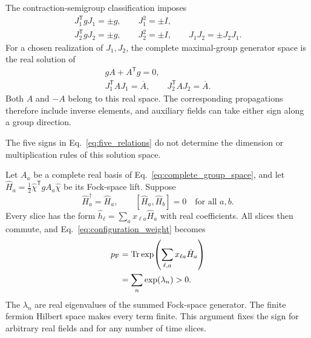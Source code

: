 \documentclass[onecolumn,aps,prb,amsmath,amssymb,superscriptaddress,longbibliography]{revtex4-2}
\newcommand{\Tr}{\operatorname{Tr}}
\newcommand{\trans}{\mathsf{T}}
\begin{document}
The contraction-semigroup classification imposes
\begin{equation}
\begin{gathered}
    J_1^\trans gJ_1=\pm g,\qquad J_1^2=\pm I,\\
    J_2^\trans gJ_2=\pm g,\qquad J_2^2=\pm I,\qquad
    J_1J_2=\pm J_2J_1 .
\end{gathered}
    \label{eq:five_relations}
\end{equation}
For a chosen realization of \(J_1,J_2\), the complete maximal-group generator
space is the real solution of
\begin{equation}
\begin{gathered}
    gA+A^\trans g=0,\\
    J_1^\trans AJ_1=\overline A,\qquad
    J_2^\trans AJ_2=\overline A .
\end{gathered}
    \label{eq:complete_group_space}
\end{equation}
Both \(A\) and \(-A\) belong to this real space.  The corresponding
propagations therefore include inverse elements, and auxiliary fields can take
either sign along a group direction.

The five signs in Eq.~\eqref{eq:five_relations} do not determine the dimension
or multiplication rules of this solution space.

Let \(A_a\) be a complete real basis of
Eq.~\eqref{eq:complete_group_space}, and let
\(\hat H_a=\frac12\hat\chi^\trans gA_a\hat\chi\) be its Fock-space lift.
Suppose
\begin{equation}
    \hat H_a^\dagger=\hat H_a,
    \qquad
    [\hat H_a,\hat H_b]=0
    \quad\text{for all }a,b .
    \label{eq:commuting_hermitian_condition}
\end{equation}
Every slice has the form
\(\hat h_\ell=\sum_a x_{\ell a}\hat H_a\) with real coefficients.  All slices
then commute, and Eq.~\eqref{eq:configuration_weight} becomes
\begin{equation}
\begin{aligned}
    p_{\rm F}
    &=\Tr\exp\!\left(\sum_{\ell,a}x_{\ell a}\hat H_a\right)\\
    &=\sum_n \exp(\lambda_n)>0 .
\end{aligned}
    \label{eq:fermion_positive_trace}
\end{equation}
The \(\lambda_n\) are real eigenvalues of the summed Fock-space generator.
The finite fermion Hilbert space makes every term finite.  This argument fixes
the sign for arbitrary real fields and for any number of time slices.
\end{document}
